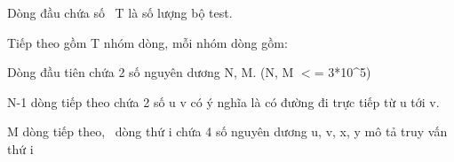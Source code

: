 Dòng đầu chứa số  T là số lượng bộ test.

Tiếp theo gồm T nhóm dòng, mỗi nhóm dòng gồm:

Dòng đầu tiên chứa 2 số nguyên dương N, M. (N, M $<$= 3*10\textasciicircum5)

N-1 dòng tiếp theo chứa 2 số u v có ý nghĩa là có đường đi trực tiếp từ u tới v.

M dòng tiếp theo,  dòng thứ i chứa 4 số nguyên dương u, v, x, y mô tả truy vấn thứ i